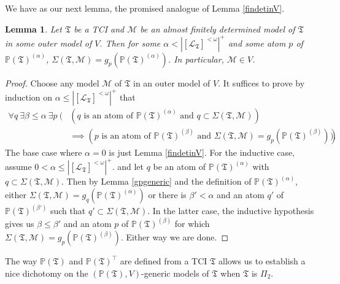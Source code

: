 \documentclass[12pt, twoside]{memoir}
\numberwithin{equation}{section}
\newtheorem{lem}[thm]{Lemma}
\theoremstyle{definition}
\theoremstyle{remark}
\theoremstyle{definition}
\theoremstyle{definition}
\theoremstyle{definition}
\theoremstyle{remark}
\begin{document}
We have as our next lemma, the promised analogue of Lemma \ref{findetinV}.

\begin{lem}\label{afdinV}
Let $\mathfrak{T}$ be a TCI and $\mathcal{M}$ be an almost finitely determined model of $\mathfrak{T}$ in some outer model of $V$. Then for some $\alpha < |[\mathcal{L}_{\mathfrak{T}}]^{< \omega}|^+$ and some atom $p$ of $\mathbb{P}(\mathfrak{T})^{(\alpha)}$, $\Sigma(\mathfrak{T}, \mathcal{M}) = g_p (\mathbb{P}(\mathfrak{T})^{(\alpha)})$. In particular, $\mathcal{M} \in V$.
\end{lem}

\begin{proof}
Choose any model $\mathcal{M}$ of $\mathfrak{T}$ in an outer model of $V$. It suffices to prove by induction on $\alpha \leq |[\mathcal{L}_{\mathfrak{T}}]^{< \omega}|^+$ that
\begin{align*}
    \forall q \ \exists \beta \leq \alpha \ \exists p \ ( & (q \text{ is an atom of } \mathbb{P}(\mathfrak{T})^{(\alpha)} \text{ and } q \subset \Sigma(\mathfrak{T}, \mathcal{M})) \\
    & \implies (p \text{ is an atom of } \mathbb{P}(\mathfrak{T})^{(\beta)} \text{ and } \Sigma(\mathfrak{T}, \mathcal{M}) = g_p (\mathbb{P}(\mathfrak{T})^{(\beta)}))) \text{.}
\end{align*}
The base case where $\alpha = 0$ is just Lemma \ref{findetinV}. For the inductive case, assume $0 < \alpha \leq |[\mathcal{L}_{\mathfrak{T}}]^{< \omega}|^+$. and let $q$ be an atom of $\mathbb{P}(\mathfrak{T})^{(\alpha)}$ with $q \subset \Sigma(\mathfrak{T}, \mathcal{M})$. Then by Lemma \ref{gpgeneric} and the definition of $\mathbb{P}(\mathfrak{T})^{(\alpha)}$, either $\Sigma(\mathfrak{T}, \mathcal{M}) = g_q (\mathbb{P}(\mathfrak{T})^{(\alpha)})$ or there is $\beta' < \alpha$ and an atom $q'$ of $\mathbb{P}(\mathfrak{T})^{(\beta')}$ such that $q' \subset \Sigma(\mathfrak{T}, \mathcal{M})$. In the latter case, the inductive hypothesis gives us $\beta \leq \beta'$ and an atom $p$ of $\mathbb{P}(\mathfrak{T})^{(\beta)}$ for which $\Sigma(\mathfrak{T}, \mathcal{M}) = g_p (\mathbb{P}(\mathfrak{T})^{(\beta)})$. Either way we are done.
\end{proof}

The way $\mathbb{P}(\mathfrak{T})$ and $\mathbb{P}(\mathfrak{T})^{\top}$ are defined from a TCI $\mathfrak{T}$ allows us to establish a nice dichotomy on the $(\mathbb{P}(\mathfrak{T}), V)$-generic models of $\mathfrak{T}$ when $\mathfrak{T}$ is $\Pi_2$.
\end{document}
